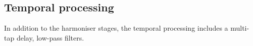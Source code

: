 \subsection{Temporal processing}
In addition to the harmoniser stages, the temporal processing includes a multi-tap delay, low-pass filters.  
